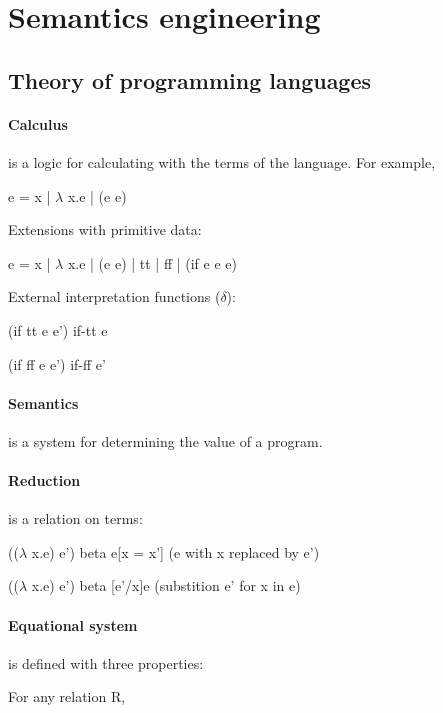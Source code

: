 \section{Semantics engineering}

\subsection{Theory of programming languages}

\paragraph{Calculus} is a logic for calculating with the terms of the language.
For example,

\hspace{\parindent}
e = x | $\lambda$ x.e | (e e)

Extensions with primitive data:

\hspace{\parindent}
e = x | $\lambda$ x.e | (e e) | tt | ff | (if e e e)

External interpretation functions ($\delta$):

\hspace{\parindent}
(if tt e e') if-tt e

\hspace{\parindent}
(if ff e e') if-ff e'

\paragraph{Semantics} is a system for determining the value of a program.

\paragraph{Reduction} is a relation on terms:

\hspace{\parindent}
(($\lambda$ x.e) e') beta e[x = x'] (e with x replaced by e')

\hspace{\parindent}
(($\lambda$ x.e) e') beta [e'/x]e (substition e' for x in e)

\paragraph{Equational system} is defined with three properties:

For any relation R,


